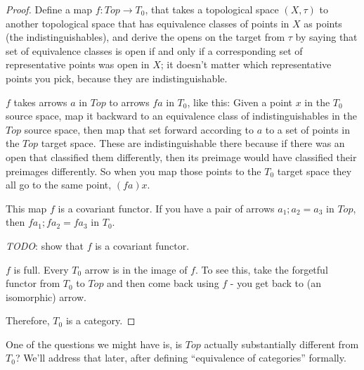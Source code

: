 \documentclass{proc-l}
\theoremstyle{definition}
\theoremstyle{remark}
\numberwithin{equation}{section}
\begin{document}
\begin{proof}
Define a map $f: Top \rightarrow T_0$,
that takes a topological space $(X, \tau)$ to another topological space that has equivalence classes of points in $X$ as points (the indistinguishables), and derive the opens on the target from $\tau$ by saying that set of equivalence classes is open if and only if a corresponding set of representative points was open in $X$; it doesn't matter which representative points you pick, because they are indistinguishable. 

$f$ takes arrows $a$ in $Top$ to arrows $f a$ in $T_0$, like this: Given a point $x$ in the $T_0$ source space,
map it backward to an equivalence class of
indistinguishables in the $Top$ source space,
then map that set forward according to $a$ to a set of points 
in the $Top$ target space. These are indistinguishable there because if there was an open that classified them differently,
then its preimage would have classified their preimages differently. So when you map those points to the $T_0$ target space they all go to the same point, $(f a) x$.

This map $f$ is a covariant functor. If you have a pair of arrows $a_1 ; a_2 = a_3$ in $Top$, then $f a_1 ; f a_2 = f a_3$ in $T_0$.

\emph{TODO}: show that $f$ is a covariant functor.



$f$ is full. Every $T_0$ arrow is in the image of $f$. To see this, take the forgetful functor from $T_0$ to $Top$ and then come back using $f$ - you get back to (an isomorphic) arrow.

Therefore, $T_0$ is a category.

\end{proof}

One of the questions we might have is, is $Top$ actually 
substantially different from $T_0$? We'll address that later,
after defining ``equivalence of categories'' formally.
\end{document}

